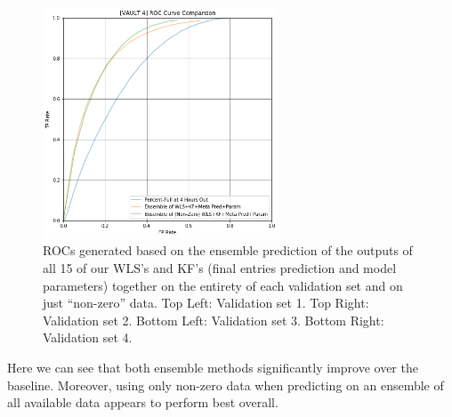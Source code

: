 \begin{figure}[h]
\includegraphics[width=7cm]{body/results/Graphs/Meta+Series/Compare/v4.png}
\caption{ROCs generated based on the ensemble prediction of the outputs of all 15 of our WLS's and KF's (final entries prediction and model parameters) together on the entirety of each validation set and on just ``non-zero'' data. Top Left: Validation set 1. Top Right: Validation set 2. Bottom Left: Validation set 3. Bottom Right: Validation set 4.}
\label{fig:MetSerComp}
\end{figure}

Here we can see that both ensemble methods significantly improve over the baseline. Moreover, using only non-zero data when predicting on an ensemble of all available data appears to perform best overall.

\pagebreak